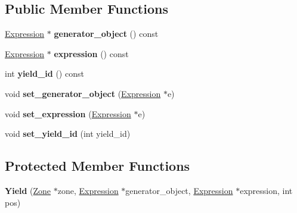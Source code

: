 \subsection*{Public Member Functions}
\begin{DoxyCompactItemize}
\item 
\hyperlink{classv8_1_1internal_1_1_expression}{Expression} $\ast$ {\bfseries generator\+\_\+object} () const \hypertarget{classv8_1_1internal_1_1_yield_ac78370633e88d408b47ea8109a9d3317}{}\label{classv8_1_1internal_1_1_yield_ac78370633e88d408b47ea8109a9d3317}

\item 
\hyperlink{classv8_1_1internal_1_1_expression}{Expression} $\ast$ {\bfseries expression} () const \hypertarget{classv8_1_1internal_1_1_yield_a3f86e5169cf606707eb8b90745aa43ad}{}\label{classv8_1_1internal_1_1_yield_a3f86e5169cf606707eb8b90745aa43ad}

\item 
int {\bfseries yield\+\_\+id} () const \hypertarget{classv8_1_1internal_1_1_yield_a9801937b8bd26f0d81cc04f2739d32b9}{}\label{classv8_1_1internal_1_1_yield_a9801937b8bd26f0d81cc04f2739d32b9}

\item 
void {\bfseries set\+\_\+generator\+\_\+object} (\hyperlink{classv8_1_1internal_1_1_expression}{Expression} $\ast$e)\hypertarget{classv8_1_1internal_1_1_yield_a8c23189d89627a36ffa9dea4cebedd3a}{}\label{classv8_1_1internal_1_1_yield_a8c23189d89627a36ffa9dea4cebedd3a}

\item 
void {\bfseries set\+\_\+expression} (\hyperlink{classv8_1_1internal_1_1_expression}{Expression} $\ast$e)\hypertarget{classv8_1_1internal_1_1_yield_a08dff97c73a72d2257a7ae581456d2c8}{}\label{classv8_1_1internal_1_1_yield_a08dff97c73a72d2257a7ae581456d2c8}

\item 
void {\bfseries set\+\_\+yield\+\_\+id} (int yield\+\_\+id)\hypertarget{classv8_1_1internal_1_1_yield_adfc7c50ed1b398ff4b345773a97170b7}{}\label{classv8_1_1internal_1_1_yield_adfc7c50ed1b398ff4b345773a97170b7}

\end{DoxyCompactItemize}
\subsection*{Protected Member Functions}
\begin{DoxyCompactItemize}
\item 
{\bfseries Yield} (\hyperlink{classv8_1_1internal_1_1_zone}{Zone} $\ast$zone, \hyperlink{classv8_1_1internal_1_1_expression}{Expression} $\ast$generator\+\_\+object, \hyperlink{classv8_1_1internal_1_1_expression}{Expression} $\ast$expression, int pos)\hypertarget{classv8_1_1internal_1_1_yield_a98ee13ab22908fc5e5ef89682fc1eb9a}{}\label{classv8_1_1internal_1_1_yield_a98ee13ab22908fc5e5ef89682fc1eb9a}

\end{DoxyCompactItemize}
